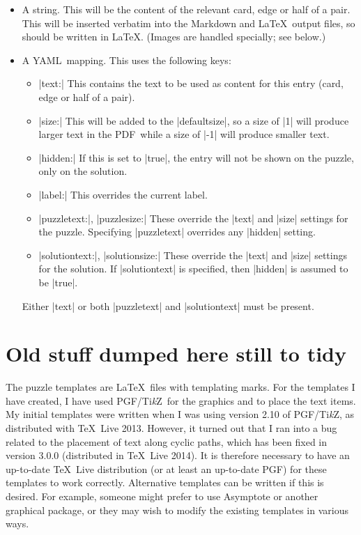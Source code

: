 \documentclass{article}
\def\YAML{{\small YAML}}
\def\PDF{{\small PDF}}
\def\PGF{{\small PGF}}
\def\TikZ{Ti\emph{k}Z}
\begin{document}
\begin{itemize}
\item A string.  This will be the content of the relevant card, edge
  or half of a pair.  This will be inserted verbatim into the Markdown
  and \LaTeX\ output files, so should be written in \LaTeX.  (Images
  are handled specially; see below.)
\item A \YAML\ mapping.  This uses the following keys:
  \begin{itemize}
  \item |text:| This contains the text to be used as content for this
    entry (card, edge or half of a pair).
  \item |size:| This will be added to the |defaultsize|, so a size of
    |1| will produce larger text in the \PDF\, while a size of |-1|
    will produce smaller text.
  \item |hidden:| If this is set to |true|, the entry will not be
    shown on the puzzle, only on the solution.
  \item |label:| This overrides the current label.
  \item |puzzletext:|, |puzzlesize:| These override the |text| and
    |size| settings for the puzzle.  Specifying |puzzletext| overrides
    any |hidden| setting.
  \item |solutiontext:|, |solutionsize:| These override the |text| and
    |size| settings for the solution.  If |solutiontext| is specified,
    then |hidden| is assumed to be |true|.
  \end{itemize}
  Either |text| or both |puzzletext| and |solutiontext| must be
  present.
\end{itemize}



\section{Old stuff dumped here still to tidy}

The puzzle templates are \LaTeX\ files with templating marks.  For the
templates I have created, I have used \PGF/\TikZ\ for the graphics and
to place the text items.  My initial templates were written when I was
using version 2.10 of \PGF/\TikZ, as distributed with \TeX~Live 2013.
However, it turned out that I ran into a bug related to the placement
of text along cyclic paths, which has been fixed in version 3.0.0
(distributed in \TeX~Live 2014).  It is therefore necessary to have an
up-to-date \TeX~Live distribution (or at least an up-to-date \PGF) for
these templates to work correctly.  Alternative templates can be
written if this is desired.  For example, someone might prefer to use
Asymptote or another graphical package, or they may wish to modify the
existing templates in various ways.
\end{document}
